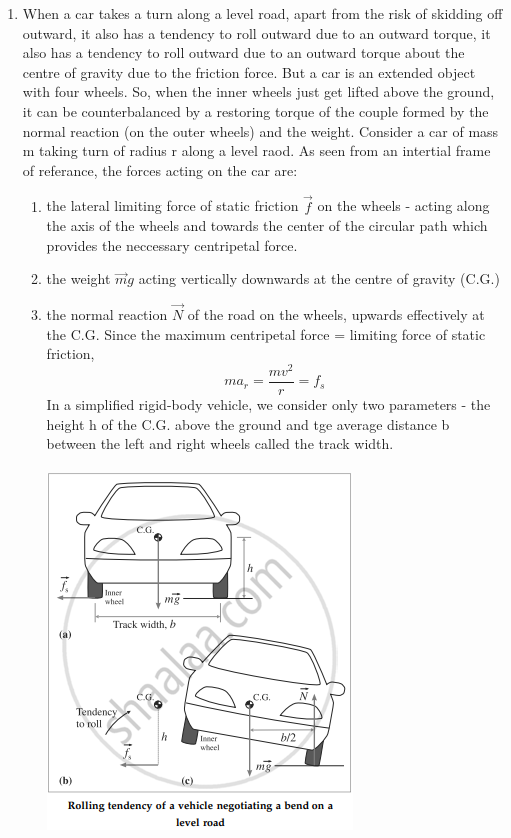 \documentclass{article}
\begin{document}
\begin{enumerate}
	\item When a car takes a turn along a level road, apart
	from the risk of skidding off outward, it also has a
	tendency to roll outward due to an outward torque, it 
	also has a tendency to roll outward due to an outward
	torque about the centre of gravity due to the friction
	force. But a car is an extended object with four wheels.
	So, when the inner wheels just get lifted above the
	ground, it can be counterbalanced by a restoring
	torque of the couple formed by the normal reaction (on
	the outer wheels) and the weight. Consider a car of mass
	m taking turn of radius r along a level raod. As seen
	from an intertial frame of referance, the forces acting
	on the car are:
	\begin{enumerate}
		\item the lateral limiting force of static 
		friction $\vec{f}$ on the wheels - acting along
		the axis of the wheels and towards the center of
		the circular path which provides the neccessary 
		centripetal force.
		\item the weight $\vec{m}g$ acting vertically 
		downwards at the centre of gravity (C.G.)
		\item the normal reaction $\vec{N}$ of the road
		on the wheels, upwards effectively at the C.G.
		Since the maximum centripetal force = limiting
		force of static friction,
		\begin{equation}
			ma_r = \frac{mv^2}{r} = f_s
		\end{equation}
		In a simplified rigid-body vehicle, we consider
		only two parameters - the height h of the C.G.
		above the ground and tge average distance b
		between the left and right wheels called the 
		track width.\\\\

		\includegraphics[scale=0.5]{rolling} \\\\


\end{enumerate}
\end{enumerate}
\end{document}
